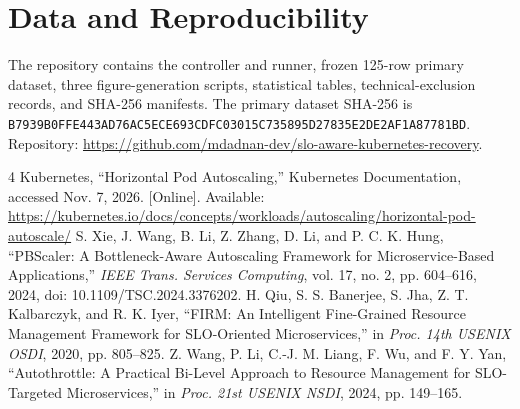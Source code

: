 \documentclass[10pt,twocolumn]{article}
\begin{document}
\section*{Data and Reproducibility}
The repository contains the controller and runner, frozen 125-row primary dataset, three figure-generation scripts, statistical tables, technical-exclusion records, and SHA-256 manifests. The primary dataset SHA-256 is \texttt{B7939B0FFE443AD76AC5ECE693CDFC03015C735895D27835E2DE2AF1A87781BD}. Repository: \url{https://github.com/mdadnan-dev/slo-aware-kubernetes-recovery}.

\begin{thebibliography}{4}
 Kubernetes, ``Horizontal Pod Autoscaling,'' Kubernetes Documentation, accessed Nov. 7, 2026. [Online]. Available: \url{https://kubernetes.io/docs/concepts/workloads/autoscaling/horizontal-pod-autoscale/}
 S. Xie, J. Wang, B. Li, Z. Zhang, D. Li, and P. C. K. Hung, ``PBScaler: A Bottleneck-Aware Autoscaling Framework for Microservice-Based Applications,'' \emph{IEEE Trans. Services Computing}, vol. 17, no. 2, pp. 604--616, 2024, doi: 10.1109/TSC.2024.3376202.
 H. Qiu, S. S. Banerjee, S. Jha, Z. T. Kalbarczyk, and R. K. Iyer, ``FIRM: An Intelligent Fine-Grained Resource Management Framework for SLO-Oriented Microservices,'' in \emph{Proc. 14th USENIX OSDI}, 2020, pp. 805--825.
 Z. Wang, P. Li, C.-J. M. Liang, F. Wu, and F. Y. Yan, ``Autothrottle: A Practical Bi-Level Approach to Resource Management for SLO-Targeted Microservices,'' in \emph{Proc. 21st USENIX NSDI}, 2024, pp. 149--165.
\end{thebibliography}
\end{document}
